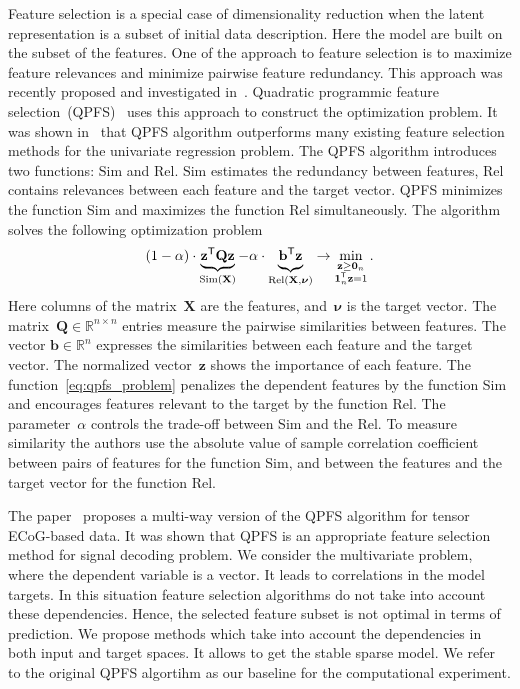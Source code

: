 \documentclass[12pt,twoside]{article}
\theoremstyle{definition}
\newcommand{\bz}{\mathbf{z}}
\newcommand{\bb}{\mathbf{b}}
\newcommand{\bX}{\mathbf{X}}
\newcommand{\bQ}{\mathbf{Q}}
\newcommand{\bbR}{\mathbb{R}}
\newcommand{\T}{\mathsf{T}}
\newcommand{\bnu}{\boldsymbol{\nu}}
\newcommand{\bOne}{\boldsymbol{1}}
\newcommand{\bZero}{\boldsymbol{0}}
\begin{document}
Feature selection is a special case of dimensionality reduction when the latent representation is a subset of initial data description. 
Here the model are built on the subset of the features. 
One of the approach to feature selection is to maximize feature relevances and minimize pairwise feature redundancy. 
This approach was recently proposed and investigated in~\cite{ding2005minimum,yamada2014high}.
Quadratic programmic feature selection~(QPFS)~\cite{rodriguez2010quadratic} uses this approach to construct the optimization problem. It was shown in~\cite{katrutsa2017comprehensive} that QPFS algorithm outperforms many existing feature selection methods for the univariate regression problem. 
The QPFS algorithm introduces two functions: $\text{Sim}$ and $\text{Rel}$.
$\text{Sim}$ estimates the redundancy between features, $\text{Rel}$ contains relevances between each feature and the target vector.
QPFS minimizes the function Sim and maximizes the function Rel simultaneously.
The algorithm solves the following optimization problem
\begin{equation}
(1 - \alpha) \cdot \underbrace{\bz^{\T} \bQ \bz}_{\text{Sim}(\bX)} - \alpha \cdot \underbrace{\vphantom{()} \bb^{\T} \bz}_{\text{Rel} (\bX, \bnu)} \rightarrow \min_{\substack{\bz \geq \bZero_n \\ \bOne_n^{\T} \bz=1}}.
\label{eq:qpfs_problem}
\end{equation}
Here columns of the matrix~$\bX$ are the features, and~$\bnu$ is the target vector. 
The matrix~$\bQ \in \bbR^{n \times n}$ entries measure the pairwise similarities between features.
The vector $\bb \in \bbR^n$ expresses the similarities between each feature and the target vector.
The normalized vector~$\bz$ shows the importance of each feature.
The function~\eqref{eq:qpfs_problem} penalizes the dependent features by the function Sim and encourages features relevant to the target by the function Rel.
The parameter~$\alpha$ controls the trade-off between Sim and the Rel.
To measure similarity the authors use the absolute value of sample correlation coefficient between pairs of features for the function Sim, and between the features and the target vector for the function Rel.

The paper~\cite{motrenko2018multi} proposes a multi-way version of the QPFS algorithm for tensor ECoG-based data. 
It was shown that QPFS is an appropriate feature selection method for signal decoding problem.
We consider the multivariate problem, where the dependent variable is a vector. 
It leads to correlations in the model targets. 
In this situation feature selection algorithms do not take into account these dependencies.
Hence, the selected feature subset is not optimal in terms of prediction.
We propose methods which take into account the dependencies in both input and target spaces. 
It allows to get the stable sparse model.
We refer to the original QPFS algortihm as our baseline for the computational experiment.
\end{document}
